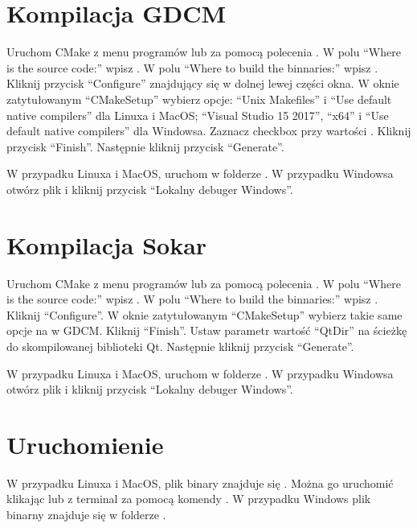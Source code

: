 \section{Kompilacja GDCM}

Uruchom CMake z menu programów lub za pomocą polecenia .
W polu \enquote{Where is the source code:} wpisz .
W polu \enquote{Where to build the binnaries:} wpisz .
Kliknij przycisk \enquote{Configure} znajdujący się w dolnej lewej części okna.
W oknie zatytułowanym \enquote{CMakeSetup} wybierz opcje: \enquote{Unix Makefiles} i \enquote{Use default native compilers} dla Linuxa i MacOS; \enquote{Visual Studio 15 2017}, \enquote{x64} i \enquote{Use default native compilers} dla Windowsa.
Zaznacz checkbox przy wartości .
Kliknij przycisk \enquote{Finish}.
Następnie kliknij przycisk \enquote{Generate}.
\par
W przypadku Linuxa i MacOS, uruchom  w folderze .
W przypadku Windowsa otwórz plik  i kliknij przycisk \enquote{Lokalny debuger Windows}.

\section{Kompilacja Sokar}

\par
Uruchom CMake z menu programów lub za pomocą polecenia .
W polu \enquote{Where is the source code:} wpisz .
W polu \enquote{Where to build the binnaries:} wpisz .
Kliknij \enquote{Configure}.
W oknie zatytułowanym \enquote{CMakeSetup} wybierz takie same opcje na w GDCM.
Kliknij \enquote{Finish}.
Ustaw parametr wartość \enquote{QtDir} na ścieżkę do skompilowanej biblioteki Qt.
Następnie kliknij przycisk \enquote{Generate}.
\par
W przypadku Linuxa i MacOS, uruchom  w folderze .
W przypadku Windowsa otwórz plik  i kliknij przycisk \enquote{Lokalny debuger Windows}.

\section{Uruchomienie}

W przypadku Linuxa i MacOS, plik binary znajduje się .
Można go uruchomić klikając lub z terminal za pomocą komendy .
W przypadku Windows plik binarny znajduje się w folderze .